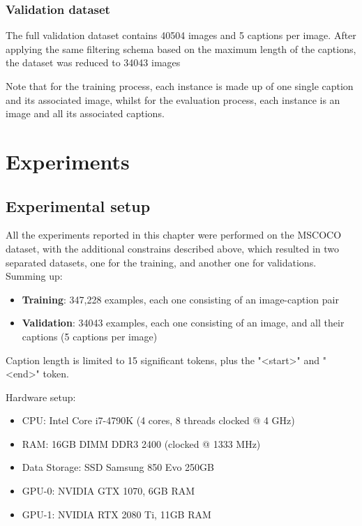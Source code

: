 \subsubsection{Validation dataset}

The full validation dataset contains 40504 images and 5 captions per image. After applying the same filtering schema based on the maximum length of the captions, the dataset was reduced to 34043 images

Note that for the training process, each instance is made up of one single caption and its associated image, whilst for the evaluation process, each instance is an image and all its associated captions. 

\section{Experiments}

\subsection{Experimental setup}

All the experiments reported in this chapter were performed on the MSCOCO dataset, with the additional constrains described above, which resulted in two separated datasets, one for the training, and another one for validations. Summing up:

\begin{itemize}
    \item \textbf{Training}: 347,228 examples, each one consisting of an image-caption pair
    \item \textbf{Validation}: 34043 examples, each one consisting of an image, and all their captions (5 captions per image)
\end{itemize}

Caption length is limited to 15 significant tokens, plus the "<start>" and "<end>" token.

Hardware setup:
\begin{itemize}
    \item CPU: Intel Core i7-4790K (4 cores, 8 threads clocked @ 4 GHz)
    \item RAM: 16GB DIMM DDR3 2400 (clocked @ 1333 MHz)
    \item Data Storage: SSD Samsung 850 Evo 250GB
    \item GPU-0: NVIDIA GTX 1070, 6GB RAM
    \item GPU-1: NVIDIA RTX 2080 Ti, 11GB RAM
\end{itemize}

